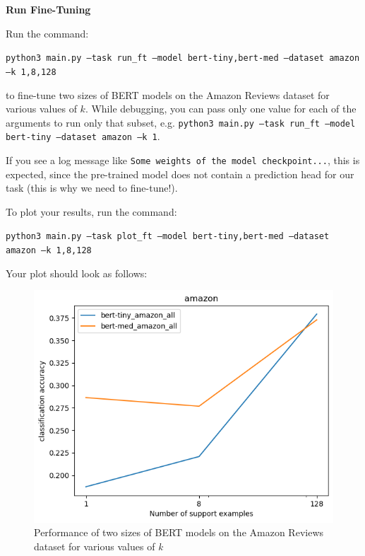 \item {} {\bf Run Fine-Tuning}

Run the command:
    
{\small\texttt{python3 main.py --task run\_ft --model bert-tiny,bert-med --dataset amazon --k 1,8,128}}

to fine-tune two sizes of BERT models on the Amazon Reviews dataset for various values of $k$. While debugging, you can pass only one value for each of the arguments to run only that subset, e.g. \texttt{python3 main.py --task run\_ft --model bert-tiny --dataset amazon --k 1}.

If you see a log message like \texttt{Some weights of the model checkpoint...}, this is expected, since the pre-trained model does not contain a prediction head for our task (this is why we need to fine-tune!).

To plot your results, run the command:

{\small\texttt{python3 main.py --task plot\_ft --model bert-tiny,bert-med --dataset amazon --k 1,8,128}}

Your plot should look as follows:
\begin{figure}[H]
    \centering
    \includegraphics[width=0.75\linewidth]{./figures/q1_plot}
    \caption{Performance of two sizes of BERT models on the Amazon Reviews dataset for various values of \textit{k}}
\end{figure}

\clearpage
